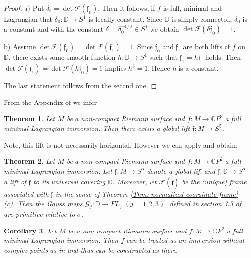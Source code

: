 \documentclass[a4paper,11pt]{amsart}
\newtheorem{theorem}{Theorem}[section]
\newtheorem{corollary}[theorem]{Corollary}
\theoremstyle{definition}
\numberwithin{equation}{section}
\newcommand{\C}{\mathbb{C}}
\newcommand{\D}{\mathbb{D}}
\newcommand{\f}{\mathfrak{f}}
\begin{document}
 \begin{proof}
 a) Put $\delta_0 =  \det \mathcal{F}(\f_0 ).$ Then it follows, if $f$ is full, minimal and Lagrangian 
 that $\delta_0 : \D \rightarrow S^1$ is locally constant.
 Since $\D$ is simply-connected, $\delta_0$ is a constant and
with the  constant  $\delta = \delta_0^{-1/3} \in S^1$  we obtain
$\det  \mathcal{F}(\delta \f_0 ) = 1$.
 
 b) Assume  $\det  \mathcal{F}(\f_0 ) = \det  \mathcal{F}(\f_1 ) = 1$. Since $\f_0$ and $\f_1$ are both lifts 
 of $f$ on $\D$, there exists some smooth function $h: \D \rightarrow S^1$ such that 
 $\f_1 = h \f_0$ holds. Then  $ \det  \mathcal{F}(\f_1 ) = \det  \mathcal{F}(h \f_0 ) = 1$
 implies $h^3 = 1$. Hence $h$ is a constant.
 
 The last statement follows from the second one.
 \end{proof}
 
From the Appendix of \cite{DoKoMa} we infer
 
 \begin{theorem} \label{non-compact mLi Legendrian}
 Let $M$ be a non-compact Riemann surface and $f:M \rightarrow \C P^2$ 
 a full minimal Lagrangian  immersion. Then there exists a global lift $\f : M \rightarrow S^5$.
 \end{theorem}
 
 Note, this lift is not necessarily horizontal.
 However we can apply  \cite{DoKoMa} and obtain:
 
 \begin{theorem}
  Let $M$ be a non-compact Riemann surface and $f:M \rightarrow \C P^2$ 
 a full minimal Lagrangian  immersion. Let $\f : M \rightarrow S^5$ denote a global lift
 and  $\tilde{\f} : \D  \rightarrow S^5$ a lift of $\f$ to its universal covering $\D$.
 Moreover, let $\mathcal{F}(\tilde{\f})$ be  the (unique) frame associated with $\tilde{\f}$
 in the sense of Theorem \ref{Thm: normalized coordinate frame} (c). 
 Then the  Gauss maps $\mathcal{G}_j : \D \rightarrow FL_j$ $(j=1, 2, 3)$, defined in section 3.3 of \cite{DoKoMa},  are primitive relative to 
 $\sigma$.
 \end{theorem}
 
  \begin{corollary}
 Let $M$ be a non-compact Riemann surface and $f:M \rightarrow \C P^2$ 
 a full minimal Lagrangian  immersion. Then $f$ can be treated as an immersion without complex points as in \cite{DoKoMa} and thus can be constructed as there.
 \end{corollary}
 
\end{document}
